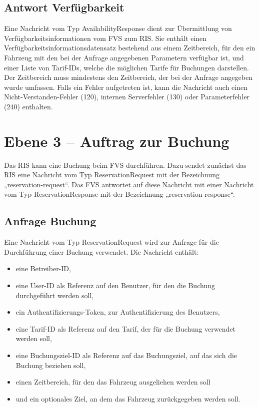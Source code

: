 

\subsection{Antwort Verfügbarkeit}
Eine Nachricht vom Typ AvailabilityResponse dient zur Übermittlung von Verfügbarkeitsinformationen vom FVS zum RIS. Sie enthält einen Verfügbarkeitsinformationsdatensatz bestehend aus einem Zeitbereich, für den ein Fahrzeug mit den bei der Anfrage angegebenen Parametern verfügbar ist, und einer Liste von Tarif-IDs, welche die möglichen Tarife für Buchungen darstellen. Der Zeitbereich muss mindestens den Zeitbereich, der bei der Anfrage angegeben wurde umfassen. Falls ein Fehler aufgetreten ist, kann die Nachricht auch einen Nicht-Verstanden-Fehler (120), internen Serverfehler (130) oder Parameterfehler (240) enthalten.




\section{Ebene 3 -- Auftrag zur Buchung}
Das RIS kann eine Buchung beim FVS durchführen. Dazu sendet zunächst das RIS eine Nachricht vom Typ ReservationRequest mit der Bezeichnung „reservation-request“. Das FVS antwortet auf diese Nachricht mit einer Nachricht vom Typ ReservationResponse mit der Bezeichnung „reservation-response“.



\subsection{Anfrage Buchung}
Eine Nachricht vom Typ ReservationRequest wird zur Anfrage für die Durchführung einer Buchung verwendet. Die Nachricht enthält:
\begin{itemize}
\item eine Betreiber-ID,
\item eine User-ID als Referenz auf den Benutzer, für den die Buchung durchgeführt werden soll,
\item ein Authentifizierungs-Token, zur Authentifizierung des Benutzers,
\item eine Tarif-ID als Referenz auf den Tarif, der für die Buchung verwendet werden soll,
\item eine Buchungsziel-ID als Referenz auf das Buchungsziel, auf das sich die Buchung beziehen soll,
\item einen Zeitbereich, für den das Fahrzeug ausgeliehen werden soll
\item und ein optionales Ziel, an dem das Fahrzeug zurückgegeben werden soll.
\end{itemize}

